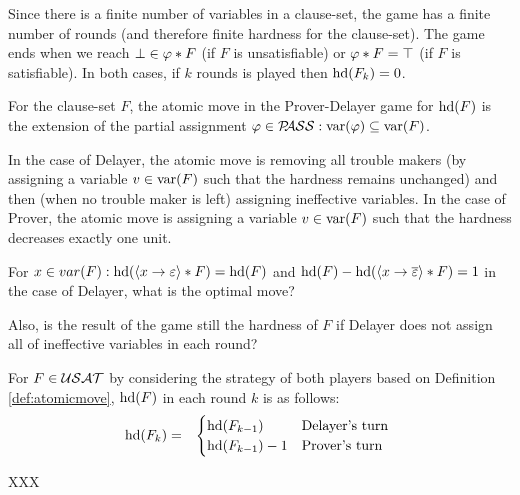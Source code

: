 \documentclass{report}
\begin{document}
Since there is a finite number of variables in a clause-set, the game has a finite number of rounds (and therefore finite hardness for the clause-set). The game ends when we reach $\bot \in \varphi * F $ (if $F$ is unsatisfiable) or $\varphi * F=\top$ (if $F$ is satisfiable). In both cases, if $k$ rounds is played then $\operatorname{hd}(F_k)=0$.

\begin{defi}\label{def:atomicmove}
For the clause-set $F$, the atomic move in the Prover-Delayer game for $\operatorname{hd}(F)$ is the extension of the partial assignment  $\varphi \in \mathcal{P\hspace{-0.32em}ASS}: \operatorname{var}(\varphi) \subseteq \operatorname{var}(F)$.

In the case of Delayer, the atomic move is removing all trouble makers (by assigning a variable $v \in \operatorname{var}(F)$ such that the hardness remains unchanged) and then (when no trouble maker is left) assigning ineffective variables. In the case of Prover, the atomic move is assigning a variable $v \in \operatorname{var}(F)$ such that the hardness decreases exactly one unit.
\end{defi}

\begin{quest}
For  $x \in var(F): \operatorname{hd}(\langle x \rightarrow \varepsilon \rangle*F)=\operatorname{hd}(F)$ and $\operatorname{hd}(F)- \operatorname{hd}(\langle x \rightarrow \overline {\varepsilon} \rangle*F) =1$ in the case of Delayer, what is the optimal move?

Also, is the result of the game still the hardness of $F$ if Delayer does not assign all of ineffective variables in each round?
\end{quest}

\begin{lem}\label{lem:hdchg}
For $F \in \mathcal{USAT}$ by considering the strategy of both players based on Definition \ref{def:atomicmove}, $\operatorname{hd}(F)$ in each round $k$ is as follows:
  \begin{eqnarray*}
  \operatorname{hd}(F_k) & = &
  \begin{cases}
  \operatorname{hd}(F_{k-1}) & \text{Delayer's turn }\\ \operatorname{hd}(F_{k-1})-1 & \text{Prover's turn}
  \end{cases}
  \end{eqnarray*}
\end{lem}
\begin{prf}
XXX
\end{prf}
\end{document}
